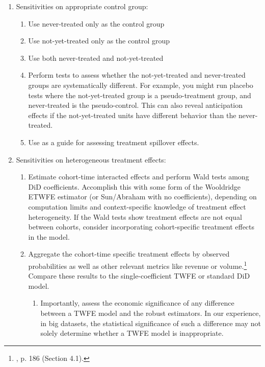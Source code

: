 \documentclass[12pt]{article}
\begin{document}
\begin{enumerate}
    \item Sensitivities on appropriate control group:
    \begin{enumerate}
        \item Use never-treated only as the control group
        \item Use not-yet-treated only as the control group
        \item Use both never-treated and not-yet-treated
        \item Perform tests to assess whether the not-yet-treated and never-treated groups are systematically different. For example, you might run placebo tests where the not-yet-treated group is a pseudo-treatment group, and never-treated is the pseudo-control. This can also reveal anticipation effects if the not-yet-treated units have different behavior than the never-treated.
        \item Use \citet{clarke2017estimating} as a guide for assessing treatment spillover effects.
    \end{enumerate}
    \item Sensitivities on heterogeneous treatment effects:
    \begin{enumerate}
        \item Estimate cohort-time interacted effects and perform Wald tests among DiD coefficients. Accomplish this with some form of the Wooldridge ETWFE estimator (or Sun/Abraham with no coefficients), depending on computation limits and context-specific knowledge of treatment effect heterogeneity. If the Wald tests show treatment effects are not equal between cohorts, consider incorporating cohort-specific treatment effects in the model.
        \item Aggregate the cohort-time specific treatment effects by observed probabilities  as well as other relevant metrics like revenue or volume.\footnote{\citet{sunabr2021a}, p. 186 (Section 4.1).}  Compare these results to the single-coefficient TWFE or standard DiD model.
        \begin{enumerate}
            \item Importantly, assess the economic significance of any difference between a TWFE model and the robust estimators. In our experience, in big datasets, the statistical significance of such a difference may not solely determine whether a TWFE model is inappropriate.
        \end{enumerate}

\end{enumerate}
\end{enumerate}
\end{document}
